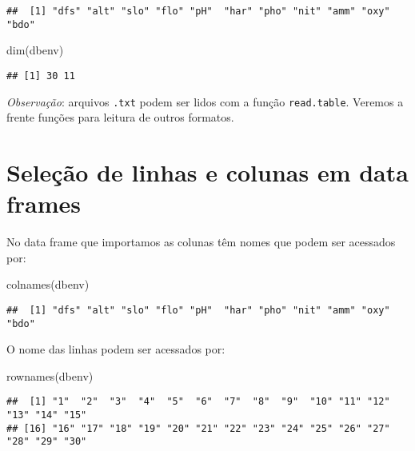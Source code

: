 \documentclass[
]{book}
\newenvironment{Shaded}{\begin{snugshade}}{\end{snugshade}}
\newcommand{\FunctionTok}[1]{\textcolor[rgb]{0.00,0.00,0.00}{#1}}
\newcommand{\NormalTok}[1]{#1}
\begin{document}
\begin{verbatim}
##  [1] "dfs" "alt" "slo" "flo" "pH"  "har" "pho" "nit" "amm" "oxy" "bdo"
\end{verbatim}

\begin{Shaded}
\begin{Highlighting}[]
\FunctionTok{dim}\NormalTok{(dbenv)}
\end{Highlighting}
\end{Shaded}

\begin{verbatim}
## [1] 30 11
\end{verbatim}

\emph{Observação}: arquivos \texttt{.txt} podem ser lidos com a função \texttt{read.table}. Veremos a frente funções para leitura de outros formatos.

\hypertarget{seleuxe7uxe3o-de-linhas-e-colunas-em-data-frames}{%
\section{Seleção de linhas e colunas em data frames}\label{seleuxe7uxe3o-de-linhas-e-colunas-em-data-frames}}

No data frame que importamos as colunas têm nomes que podem ser acessados por:

\begin{Shaded}
\begin{Highlighting}[]
\FunctionTok{colnames}\NormalTok{(dbenv)}
\end{Highlighting}
\end{Shaded}

\begin{verbatim}
##  [1] "dfs" "alt" "slo" "flo" "pH"  "har" "pho" "nit" "amm" "oxy" "bdo"
\end{verbatim}

O nome das linhas podem ser acessados por:

\begin{Shaded}
\begin{Highlighting}[]
\FunctionTok{rownames}\NormalTok{(dbenv)}
\end{Highlighting}
\end{Shaded}

\begin{verbatim}
##  [1] "1"  "2"  "3"  "4"  "5"  "6"  "7"  "8"  "9"  "10" "11" "12" "13" "14" "15"
## [16] "16" "17" "18" "19" "20" "21" "22" "23" "24" "25" "26" "27" "28" "29" "30"
\end{verbatim}
\end{document}

